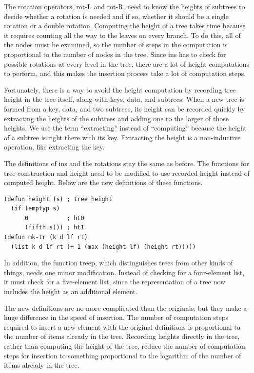 The rotation operators, rot-L and rot-R, need to know the heights of subtrees
to decide whether a rotation is needed and if so, whether it should
be a single rotation or a double rotation.
Computing the height of a tree takes time because it requires counting
all the way to the leaves on every branch.
To do this, all of the nodes must be examined, so the number of steps in
the computation is proportional to the number of nodes in the tree.
Since ins has to check for possible rotations at every level in the
tree, there are a lot of height computations to perform, and this
makes the insertion process take a lot of computation steps.

Fortunately, there is a way to avoid the height computation
by recording tree height in the tree itself,
along with keys, data, and subtrees.
When a new tree is formed from a key, data, and two subtrees,
its height can be recorded quickly by extracting the heights of the
subtrees and adding one to the larger of those heights.
We use the term ``extracting'' instead of ``computing''
because the height of a subtree is right there with its key.
Extracting the height is a non-inductive operation,
like extracting the key.

The definitions of ins and the rotations stay the same as before.
The functions for tree construction and height
need to be modified to use recorded height instead of computed height.
Below are the new definitions of these functions.

\begin{center}
\begin{Verbatim}
(defun height (s) ; tree height
  (if (emptyp s)
      0           ; ht0
      (fifth s))) ; ht1
(defun mk-tr (k d lf rt)
  (list k d lf rt (+ 1 (max (height lf) (height rt)))))
\end{Verbatim}
\end{center}

In addition, the function treep, which distinguishes
trees from other kinds of things,
needs one minor modification. Instead of checking for a four-element
list, it must check for a five-element list, since the representation
of a tree now includes the height as an additional element.

The new definitions are no more complicated than the originals,
but they make a huge difference in the speed of insertion.
The number of computation steps required to insert a new
element with the original definitions is proportional to
the number of items already in the tree.
Recording heights directly in the tree,
rather than computing the height of the tree,
reduce the number of computation
steps for insertion to something proportional to the logarithm of
the number of items already in the tree.

